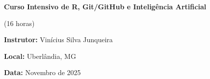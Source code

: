 \thispagestyle{empty}
\begin{titlepage}
  \centering

  {\Huge \textbf{Curso Intensivo de R, Git/GitHub e Inteligência Artificial}\par}
  \vspace{0.8cm}
  {\Large (16 horas)\par}
  \vspace{2cm}

  {\Large \textbf{Instrutor:} Vinícius Silva Junqueira}\par
  \vspace{0.4cm}
  {\Large \textbf{Local:} Uberlândia, MG}\par
  \vspace{0.4cm}
  {\Large \textbf{Data:} Novembro de 2025}\par

  \vfill
\end{titlepage}

\clearpage
{}
\clearpage
{}
